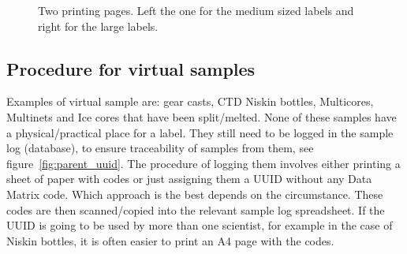 \documentclass[a4paper,english, 11pt]{article}
\begin{document}
\begin{figure}[htb]
    \caption{\label{fig:printing}
        Two printing pages. Left the one for the medium sized labels and right for the large labels.
    }
\end{figure}


\subsection{Procedure for virtual samples} %
\label{sub:Procedure_for_virtual_samples}



Examples of virtual sample are: gear casts, CTD Niskin bottles, Multicores, Multinets and Ice cores that have been split/melted. None of these samples have a physical/practical place for a label. They still need to be logged in the sample log (database), to ensure traceability of samples from them, see figure~\ref{fig:parent_uuid}. The procedure of logging them involves either printing a sheet of paper with codes or just assigning them a UUID without any Data Matrix code. Which approach is the best depends on the circumstance. These codes are then scanned/copied into the relevant sample log spreadsheet. If the UUID is going to be used by more than one scientist, for example in the case of Niskin bottles, it is often easier to print an A4 page with the codes. 
\end{document}
